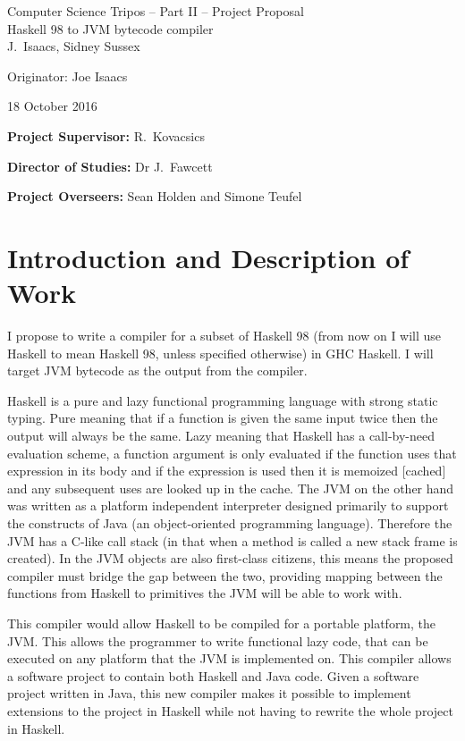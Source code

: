\documentclass[12pt,a4paper,twoside]{article}
\begin{document}
\begin{center}
  \Large
  Computer Science Tripos -- Part II -- Project Proposal\\[4mm]
  \LARGE
  Haskell 98 to JVM bytecode compiler\\[4mm]

  \large
  J.~Isaacs, Sidney Sussex

  Originator: Joe Isaacs 

  18 October 2016
\end{center}

\vspace{5mm}

\textbf{Project Supervisor:} R.~Kovacsics

\textbf{Director of Studies:} Dr J.~Fawcett 

\textbf{Project Overseers:} Sean Holden and Simone Teufel



\section*{Introduction and Description of Work}

  I propose to write a compiler for a subset of Haskell 98 (from now on I will use Haskell to mean Haskell 98, unless specified otherwise)
  in GHC Haskell. I will target JVM bytecode as the output from the compiler.



  Haskell is a pure and lazy functional programming language with strong static typing. Pure meaning that
  if a function is given the same input twice then the output will always be the same. Lazy meaning that Haskell has a
  call-by-need evaluation scheme, a function argument is only evaluated if the function uses that expression in its body
  and if the expression is used then it is memoized [cached] and any subsequent uses are looked up in the cache.
  The JVM on the other hand was  written as a platform independent interpreter designed
  primarily to support the constructs of Java (an object-oriented programming language).
  Therefore the JVM has a C-like call stack (in that when a method is called a new stack frame is created). In the JVM objects are also first-class citizens, this means
  the proposed compiler must bridge the gap between the two, providing mapping between the functions from Haskell to primitives
  the JVM will be able to work with.

  This compiler would allow Haskell to be compiled for a portable platform, the JVM. This allows the programmer to
  write functional lazy code, that can be executed on any platform that the JVM is implemented on. This compiler allows a software project to contain both
  Haskell and Java code. Given a software project written in Java, this new compiler makes it possible to implement extensions to the project in Haskell
  while not having to rewrite the whole project in Haskell.
\end{document}
